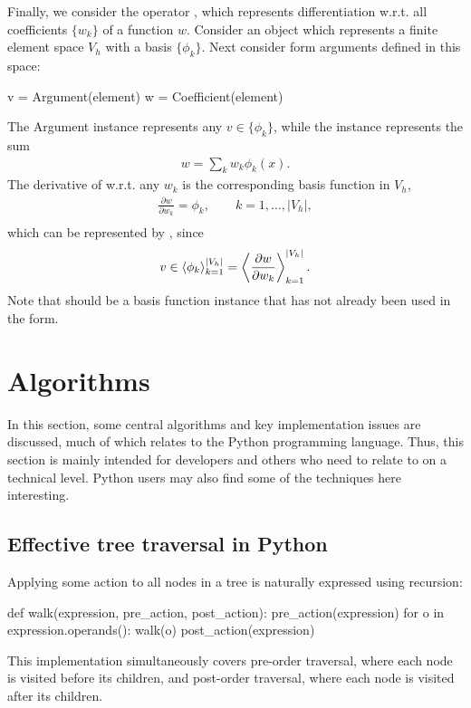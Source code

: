 Finally, we consider the operator , which represents
differentiation w.r.t. all coefficients $\{w_k\}$ of a function $w$.
Consider an object  which represents a finite element
space $V_h$ with a basis $\{\phi_k\}$.  Next consider form arguments
defined in this space:
\begin{python}
v = Argument(element)
w = Coefficient(element)
\end{python}
The Argument instance  represents any $v\in\{\phi_k\}$,
while the  instance  represents the sum
\begin{align}
w = \sum_k w_k \phi_k(x).
\end{align}
The derivative of  w.r.t. any $w_k$ is the corresponding basis function in $V_h$,
\begin{align}
\frac{\partial w}{\partial w_k} = \phi_k, \qquad k = 1, \ldots, |V_h|, \\
\end{align}
which can be represented by , since
\begin{align}
v \in \left\langle{ \phi_k }\right\rangle_{k=1}^{|V_h|} = \left\langle{ \frac{\partial w}{\partial w_k} }\right\rangle_{k=1}^{|V_h|}.
\end{align}
Note that  should be a basis function instance that has not
already been used in the form.

\section{Algorithms} \label{ufl:sec:algorithms}

In this section, some central algorithms and key implementation issues
are discussed, much of which relates to the Python programming
language.  Thus, this section is mainly intended for developers and
others who need to relate to \ufl{} on a technical level.
Python users may also find some of the techniques here interesting.

\subsection{Effective tree traversal in Python} \label{ufl:sec:traversal}

Applying some action to all nodes in a tree is naturally expressed
using recursion:
\begin{python}
def walk(expression, pre_action, post_action):
    pre_action(expression)
    for o in expression.operands():
        walk(o)
    post_action(expression)
\end{python}
This implementation simultaneously covers pre-order traversal, where
each node is visited before its children, and post-order traversal,
where each node is visited after its children.

